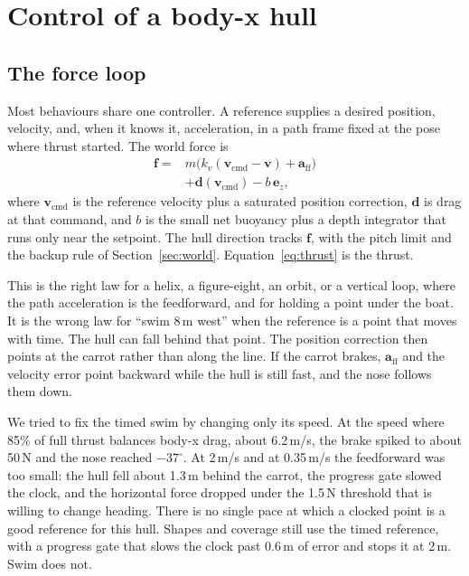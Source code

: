 \documentclass[conference]{IEEEtran}
\begin{document}
\section{Control of a body-x hull}
\label{sec:control}

\subsection{The force loop}
Most behaviours share one controller. A reference supplies a desired position, velocity, and, when it knows it, acceleration, in a path frame fixed at the pose where thrust started. The world force is
\begin{equation}
\begin{aligned}
\mathbf{f} = {} & m\big(k_{v}(\mathbf{v}_{\mathrm{cmd}}-\mathbf{v}) + \mathbf{a}_{\mathrm{ff}}\big) \\
& + \mathbf{d}(\mathbf{v}_{\mathrm{cmd}}) - b\,\mathbf{e}_{z},
\end{aligned}
\label{eq:force}
\end{equation}
where $\mathbf{v}_{\mathrm{cmd}}$ is the reference velocity plus a saturated position correction, $\mathbf{d}$ is drag at that command, and $b$ is the small net buoyancy plus a depth integrator that runs only near the setpoint. The hull direction tracks $\mathbf{f}$, with the pitch limit and the backup rule of Section~\ref{sec:world}. Equation~\eqref{eq:thrust} is the thrust.

This is the right law for a helix, a figure-eight, an orbit, or a vertical loop, where the path acceleration is the feedforward, and for holding a point under the boat. It is the wrong law for ``swim 8\,m west'' when the reference is a point that moves with time. The hull can fall behind that point. The position correction then points at the carrot rather than along the line. If the carrot brakes, $\mathbf{a}_{\mathrm{ff}}$ and the velocity error point backward while the hull is still fast, and the nose follows them down.

We tried to fix the timed swim by changing only its speed. At the speed where 85\% of full thrust balances body-x drag, about 6.2\,m/s, the brake spiked to about 50\,N and the nose reached $-37^\circ$. At 2\,m/s and at 0.35\,m/s the feedforward was too small: the hull fell about 1.3\,m behind the carrot, the progress gate slowed the clock, and the horizontal force dropped under the 1.5\,N threshold that is willing to change heading. There is no single pace at which a clocked point is a good reference for this hull. Shapes and coverage still use the timed reference, with a progress gate that slows the clock past 0.6\,m of error and stops it at 2\,m. Swim does not.
\end{document}
